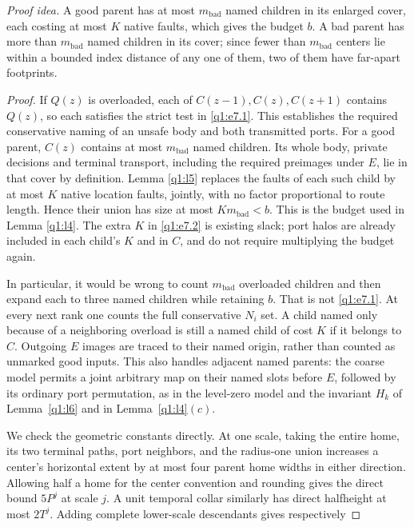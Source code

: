 \par\noindent\emph{Proof idea.} A good parent has at most \(m_{\mathrm{bad}}\) named children in its enlarged cover, each costing at most \(K\) native faults, which gives the budget \(b\). A bad parent has more than \(m_{\mathrm{bad}}\) named children in its cover; since fewer than \(m_{\mathrm{bad}}\) centers lie within a bounded index distance of any one of them, two of them have far-apart footprints.

\begin{proof}

If \(Q(z)\) is overloaded, each of \(C(z-1), C(z), C(z+1)\) contains \(Q(z)\), so each satisfies the strict test in \eqref{q1:e7.1}. This establishes the required conservative naming of an unsafe body and both transmitted ports. For a good parent, \(C(z)\) contains at most \(m_{\mathrm{bad}}\) named children. Its whole body, private decisions and terminal transport, including the required preimages under \(E\), lie in that cover by definition. Lemma \ref{q1:l5} replaces the faults of each such child by at most \(K\) native location faults, jointly, with no factor proportional to route length. Hence their union has size at most \(K m_{\mathrm{bad}}<b\). This is the budget used in Lemma \ref{q1:l4}. The extra \(K\) in \eqref{q1:e7.2} is existing slack; port halos are already included in each child's \(K\) and in \(C\), and do not require multiplying the budget again.

In particular, it would be wrong to count \(m_{\mathrm{bad}}\) overloaded children and then expand each to three named children while retaining \(b\). That is not \eqref{q1:e7.1}. At every next rank one counts the full conservative \(N_{i}\) set. A child named only because of a neighboring overload is still a named child of cost \(K\) if it belongs to \(C\). Outgoing \(E\) images are traced to their named origin, rather than counted as unmarked good inputs. This also handles adjacent named parents: the coarse model permits a joint arbitrary map on their named slots before \(E\), followed by its ordinary port permutation, as in the level-zero model and the invariant \(H_k\) of Lemma~\ref{q1:l6} and in Lemma~\ref{q1:l4}\((c)\).

We check the geometric constants directly. At one scale, taking the entire home, its two terminal paths, port neighbors, and the radius-one union increases a center's horizontal extent by at most four parent home widths in either direction. Allowing half a home for the center convention and rounding gives the direct bound \(5P^{j}\) at scale \(j\). A unit temporal collar similarly has direct halfheight at most \(2T^{j}\). Adding complete lower-scale descendants gives respectively


\end{proof}
